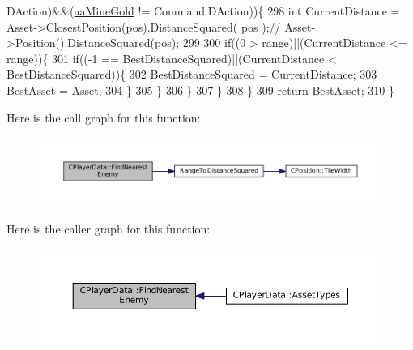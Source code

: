 \begin{DoxyCode}
      DAction)&&(\hyperlink{GameDataTypes_8h_ab47668e651a3032cfb9c40ea2d60d670abc45b1c4fbca1481e373a780a69bd56b}{aaMineGold} != Command.DAction))\{
298                 \textcolor{keywordtype}{int} CurrentDistance = Asset->ClosestPosition(pos).DistanceSquared( pos );\textcolor{comment}{//
      Asset->Position().DistanceSquared(pos);}
299                 
300                 \textcolor{keywordflow}{if}((0 > range)||(CurrentDistance <= range))\{
301                     \textcolor{keywordflow}{if}((-1 == BestDistanceSquared)||(CurrentDistance < BestDistanceSquared))\{
302                         BestDistanceSquared = CurrentDistance;
303                         BestAsset = Asset;
304                     \}
305                 \}
306             \}
307         \}
308     \}
309     \textcolor{keywordflow}{return} BestAsset;
310 \}
\end{DoxyCode}
Here is the call graph for this function\+:\nopagebreak
\begin{figure}[H]
\begin{center}
\leavevmode
\includegraphics[width=350pt]{classCPlayerData_a5f0a1280933f7bb9a65ab256ecff1a69_cgraph}
\end{center}
\end{figure}
Here is the caller graph for this function\+:\nopagebreak
\begin{figure}[H]
\begin{center}
\leavevmode
\includegraphics[width=350pt]{classCPlayerData_a5f0a1280933f7bb9a65ab256ecff1a69_icgraph}
\end{center}
\end{figure}
\hypertarget{classCPlayerData_a53c9e046c6f43fd83a0feb32b4fe999d}{}\label{classCPlayerData_a53c9e046c6f43fd83a0feb32b4fe999d} 
